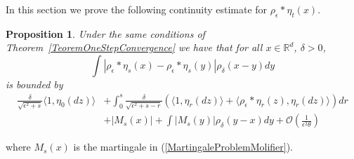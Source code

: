 \documentclass[12pt]{article}
\newtheorem{proposition}[theorem]{Proposition}
\newcommand{\IR}{\mathbb R}
\begin{document}
In this section we prove the following continuity estimate for $\rho_\epsilon * \eta_t(x)$.
\begin{proposition} \label{ContinuityEstimate}
Under the same conditions of Theorem~\ref{TeoremOneStepConvergence} we have that for all $x \in \IR^d$, $\delta>0$,
\[
\int |\rho_\epsilon*\eta_s(x) -\rho_\epsilon*\eta_s(y)| \rho_\delta(x-y) dy \]
is bounded by
\begin{align*}
\frac{\delta}{\sqrt{\epsilon^2+s}} \langle 1,\eta_0(dz) \rangle &+ \int_0^s \frac{\delta}{\sqrt{\epsilon^2+s-r}} (\langle 1, \eta_r(dz)\rangle + \langle \rho_\epsilon*\eta_r(z), \eta_r(dz)\rangle)dr \\ &+ |M_s(x)| + \int |M_s(y)| \rho_\delta(y-x)dy + \mathcal{O}\left( \frac{1}{\epsilon^2 \theta}\right)
\end{align*} 
\end{proposition}
where $M_s(x)$ is the martingale in (\ref{MartingaleProblemMolifier}).
\end{document}
